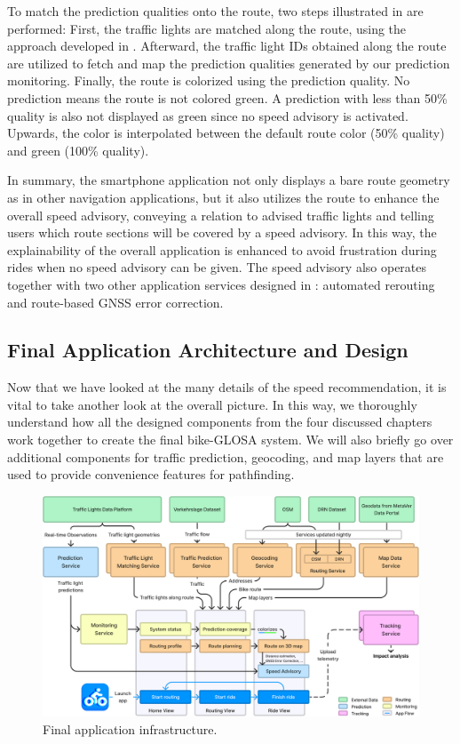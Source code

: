 To match the prediction qualities onto the route, two steps illustrated in  are performed: First, the traffic lights are matched along the route, using the approach developed in . Afterward, the traffic light IDs obtained along the route are utilized to fetch and map the prediction qualities generated by our prediction monitoring. Finally, the route is colorized using the prediction quality. No prediction means the route is not colored green. A prediction with less than 50\% quality is also not displayed as green since no speed advisory is activated. Upwards, the color is interpolated between the default route color (50\% quality) and green (100\% quality).

In summary, the smartphone application not only displays a bare route geometry as in other navigation applications, but it also utilizes the route to enhance the overall speed advisory, conveying a relation to advised traffic lights and telling users which route sections will be covered by a speed advisory. In this way, the explainability of the overall application is enhanced to avoid frustration during rides when no speed advisory can be given. The speed advisory also operates together with two other application services designed in : automated rerouting and route-based GNSS error correction.

\subsection{Final Application Architecture and Design}

Now that we have looked at the many details of the speed recommendation, it is vital to take another look at the overall picture. In this way, we thoroughly understand how all the designed components from the four discussed chapters work together to create the final bike-GLOSA system. We will also briefly go over additional components for traffic prediction, geocoding, and map layers that are used to provide convenience features for pathfinding.

\begin{figure}[!b]
\caption{Final application infrastructure.}\label{fig:architecture}
\includegraphics[width=\linewidth]{images/architecture.pdf}
\end{figure}

